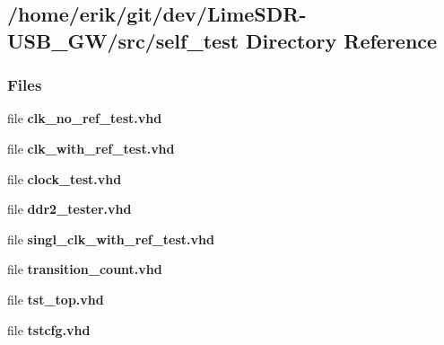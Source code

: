 \subsection{/home/erik/git/dev/\+Lime\+S\+D\+R-\/\+U\+S\+B\+\_\+\+G\+W/src/self\+\_\+test Directory Reference}
\label{dir_96a70fbc94c8660a52f65e7f9ff27fa5}
\subsubsection*{Files}
\begin{DoxyCompactItemize}
\item 
file {\bf clk\+\_\+no\+\_\+ref\+\_\+test.\+vhd}
\item 
file {\bf clk\+\_\+with\+\_\+ref\+\_\+test.\+vhd}
\item 
file {\bf clock\+\_\+test.\+vhd}
\item 
file {\bf ddr2\+\_\+tester.\+vhd}
\item 
file {\bf singl\+\_\+clk\+\_\+with\+\_\+ref\+\_\+test.\+vhd}
\item 
file {\bf transition\+\_\+count.\+vhd}
\item 
file {\bf tst\+\_\+top.\+vhd}
\item 
file {\bf tstcfg.\+vhd}
\end{DoxyCompactItemize}

